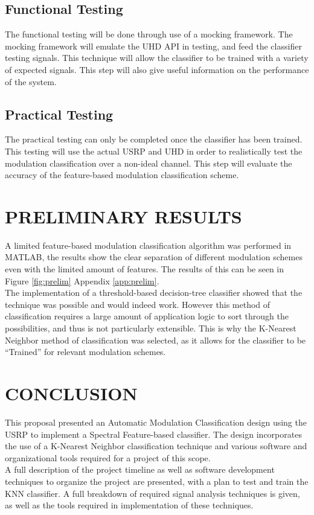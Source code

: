 \documentclass[10pt,twocolumn]{witseiepaper}
\begin{document}
	\subsection{Functional Testing}
		The functional testing will be done through use of a mocking framework. The mocking framework will emulate the UHD API in testing, and feed the classifier testing signals. This technique will allow the classifier to be trained with a variety of expected signals. This step will also give useful information on the performance of the system.
	\subsection{Practical Testing}
		The practical testing can only be completed once the classifier has been trained. This testing will use the actual USRP and UHD in order to realistically test the modulation classification over a non-ideal channel. This step will evaluate the accuracy of the feature-based modulation classification scheme.
\section{PRELIMINARY RESULTS}
	A limited feature-based modulation classification algorithm was performed in MATLAB, the results show the clear separation of different modulation schemes even with the limited amount of features. The results of this can be seen in Figure \ref{fig:prelim} Appendix \ref{app:prelim}.\\[10pt]
	The implementation of a threshold-based decision-tree classifier showed that the technique was possible and would indeed work. However this method of classification requires a large amount of application logic to sort through the possibilities, and thus is not particularly extensible. This is why the K-Nearest Neighbor method of classification was selected, as it allows for the classifier to be ``Trained'' for relevant modulation schemes.
\section{CONCLUSION}
This proposal presented an Automatic Modulation Classification design using the USRP to implement a Spectral Feature-based classifier. The design incorporates the use of a K-Nearest Neighbor classification technique and various software and organizational tools required for a project of this scope. \\[10pt]
A full description of the project timeline as well as software development techniques to organize the project are presented, with a plan to test and train the KNN classifier. A full breakdown of required signal analysis techniques is given, as well as the tools required in implementation of these techniques.
\end{document}
